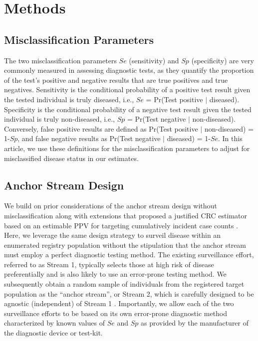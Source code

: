 \documentclass[useAMS,usenatbib,referee]{biom}
\begin{document}
\section{Methods}

\subsection{Misclassification Parameters}

The two misclassification parameters $Se$ (sensitivity) and $Sp$ (specificity) are very commonly measured in assessing diagnostic tests, as they quantify the proportion of the test’s positive and negative results that are true positives and true negatives. Sensitivity is the conditional probability of a positive test result given the tested individual is truly diseased, i.e., $Se$ = Pr(Test positive $|$ diseased). Specificity is the conditional probability of a negative test result given the tested individual is truly non-diseased, i.e., $Sp$ = Pr(Test negative $|$ non-diseased). Conversely, false positive results are defined as Pr(Test positive $|$ non-diseased) = 1-$Sp$, and false negative results as Pr(Test negative $|$ diseased) = 1-$Se$. In this article, we use these definitions for the misclassification parameters to adjust for misclassified disease status in our estimates.

\subsection{Anchor Stream Design}

We build on prior considerations of the anchor stream design without misclassification \citep{Lyles2022a,Lyles2022b} along with extensions that proposed a justified CRC estimator based on an estimable PPV for targeting cumulatively incident case counts \citep{Ge2023}. Here, we leverage the same design strategy to surveil disease within an enumerated registry population without the stipulation that the anchor stream must employ a perfect diagnostic testing method. The existing surveillance effort, referred to as Stream 1, typically selects those at high risk of disease preferentially and is also likely to use an error-prone testing method. We subsequently obtain a random sample of individuals from the registered target population as the “anchor stream”, or Stream 2, which is carefully designed to be agnostic (independent) of Stream 1 \citep{Lyles2022a,Lyles2022b}. Importantly, we allow each of the two surveillance efforts to be based on its own error-prone diagnostic method characterized by known values of $Se$ and $Sp$ as provided by the manufacturer of the diagnostic device or test-kit. 
\end{document}
